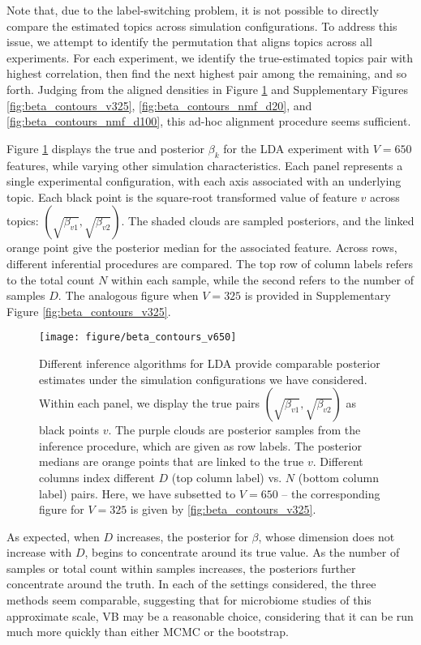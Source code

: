 \documentclass[oupdraft]{bio}
\begin{document}
Note that, due to the label-switching problem, it is not possible to directly
compare the estimated topics across simulation configurations. To address this
issue, we attempt to identify the permutation that aligns topics across all
experiments. For each experiment, we identify the true-estimated topics pair
with highest correlation, then find the next highest pair among the remaining,
and so forth. Judging from the aligned densities in Figure
\ref{fig:beta_contours_v650} and Supplementary Figures
\ref{fig:beta_contours_v325}, \ref{fig:beta_contours_nmf_d20}, and
\ref{fig:beta_contours_nmf_d100}, this ad-hoc alignment procedure seems
sufficient.

Figure \ref{fig:beta_contours_v650} displays the true and posterior $\beta_{k}$
for the LDA experiment with $V = 650$ features, while varying other simulation
characteristics. Each panel represents a single experimental configuration, with
each axis associated with an underlying topic. Each black point is the
square-root transformed value of feature $v$ across topics:
$\left(\sqrt{\beta_{v1}}, \sqrt{\beta_{v2}}\right)$. The shaded clouds are
sampled posteriors, and the linked orange point give the posterior median for the
associated feature. Across rows, different inferential procedures are compared.
The top row of column labels refers to the total count $N$ within each sample,
while the second refers to the number of samples $D$. The analogous figure when
$V = 325$ is provided in Supplementary Figure \ref{fig:beta_contours_v325}.

\begin{figure}
  \centering\texttt{[image: figure/beta\_contours\_v650]}
  \caption{Different inference algorithms for LDA provide comparable posterior
    estimates under the simulation configurations we have considered. Within
    each panel, we display the true pairs $\left(\sqrt{\beta_{v1}},
    \sqrt{\beta_{v2}}\right)$ as black points $v$. The purple clouds are
    posterior samples from the inference procedure, which are given as row
    labels. The posterior medians are orange points that are linked to the true
    $v$. Different columns index different $D$ (top column label) vs. $N$
    (bottom column label) pairs. Here, we have subsetted to $V = 650$ -- the
    corresponding figure for $V = 325$ is given by \ref{fig:beta_contours_v325}.
  }
  \label{fig:beta_contours_v650}
\end{figure}

As expected, when $D$ increases, the posterior for $\beta$, whose dimension does
not increase with $D$, begins to concentrate around its true value. As the
number of samples or total count within samples increases, the posteriors
further concentrate around the truth. In each of the settings considered, the
three methods seem comparable, suggesting that for microbiome studies of this
approximate scale, VB may be a reasonable choice, considering that it can be run
much more quickly than either MCMC or the bootstrap.
\end{document}
